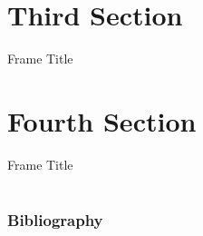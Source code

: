 \documentclass[pdf,xcolor=table]{beamer}
\begin{document}
\section{Third Section}
\begin{frame}{Frame Title}

\end{frame}

\section{Fourth Section}
\begin{frame}{Frame Title}

\end{frame}

\section*{}
\begin{frame}[t,allowframebreaks]
        \frametitle{Bibliography}
        
        
\end{frame}
\end{document}
